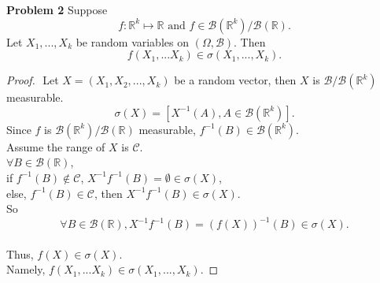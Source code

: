 \documentclass{article}
\newcommand{\llc}{\mathcal{C}}
\newcommand{\llb}{\mathcal{B}}
\newcommand{\bbr}{\mathbb{R}}
\begin{document}
\noindent \textbf{Problem 2} Suppose\\
$$f : \bbr^k \mapsto \bbr \text{ and } f \in \llb (\bbr^k)/\llb(\bbr).$$
Let $X_1, ...,X_k $ be random variables on $(\Omega, \llb)$. Then\\

$$f(X_1,...X_k) \in \sigma(X_1,...,X_k).$$
\begin{proof}
	$ $\newline
	Let $X = (X_1,X_2,...,X_k)$ be a random vector, then $X$ is $\llb/\llb(\bbr^k)$ measurable.\\
	$$\sigma(X) = [X^{-1}(A), A \in \llb(\bbr^k)].$$
	Since $f$ is $\llb(\bbr^k)/\llb(\bbr)$ measurable, $f^{-1}(B) \in \llb(\bbr^k)$.\\ 
	Assume the range of $X$ is $\llc$. \\
	$\forall B \in \llb(\bbr)$, \\
	if $f^{-1}(B) \not\in \llc$, $X^{-1}f^{-1}(B) = \emptyset \in \sigma(X)$, \\
	else, $f^{-1}(B) \in \llc$, then $X^{-1}f^{-1}(B) \in \sigma(X)$.\\
	So \\
	$$\forall B \in \llb(\bbr), X^{-1}f^{-1}(B)  = (f(X))^{-1}(B)\in \sigma(X).$$\\
	Thus, $f(X) \in \sigma(X)$.\\
	Namely, $f(X_1,...X_k) \in \sigma(X_1,...,X_k)$.
	
\end{proof}
\end{document}
